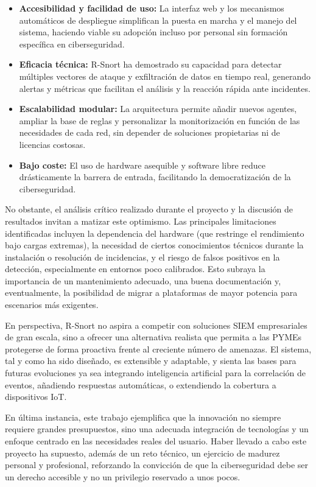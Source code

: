 \documentclass[11pt,a4paper,twoside]{report}
\begin{document}
\begin{itemize}
	\item \textbf{Accesibilidad y facilidad de uso:} La interfaz web y los mecanismos automáticos de despliegue simplifican la puesta en marcha y el manejo del sistema, haciendo viable su adopción incluso por personal sin formación específica en ciberseguridad.
	\item \textbf{Eficacia técnica:} R-Snort ha demostrado su capacidad para detectar múltiples vectores de ataque y exfiltración de datos en tiempo real, generando alertas y métricas que facilitan el análisis y la reacción rápida ante incidentes.
	\item \textbf{Escalabilidad modular:} La arquitectura permite añadir nuevos agentes, ampliar la base de reglas y personalizar la monitorización en función de las necesidades de cada red, sin depender de soluciones propietarias ni de licencias costosas.
	\item \textbf{Bajo coste:} El uso de hardware asequible y software libre reduce drásticamente la barrera de entrada, facilitando la democratización de la ciberseguridad.
\end{itemize}

No obstante, el análisis crítico realizado durante el proyecto y la discusión de resultados invitan a matizar este optimismo. Las principales limitaciones identificadas incluyen la dependencia del hardware (que restringe el rendimiento bajo cargas extremas), la necesidad de ciertos conocimientos técnicos durante la instalación o resolución de incidencias, y el riesgo de falsos positivos en la detección, especialmente en entornos poco calibrados. Esto subraya la importancia de un mantenimiento adecuado, una buena documentación y, eventualmente, la posibilidad de migrar a plataformas de mayor potencia para escenarios más exigentes.\newline

En perspectiva, R-Snort no aspira a competir con soluciones SIEM empresariales de gran escala, sino a ofrecer una alternativa realista que permita a las PYMEs protegerse de forma proactiva frente al creciente número de amenazas. El sistema, tal y como ha sido diseñado, es extensible y adaptable, y sienta las bases para futuras evoluciones ya sea integrando inteligencia artificial para la correlación de eventos, añadiendo respuestas automáticas, o extendiendo la cobertura a dispositivos IoT.\newline

En última instancia, este trabajo ejemplifica que la innovación no siempre requiere grandes presupuestos, sino una adecuada integración de tecnologías y un enfoque centrado en las necesidades reales del usuario. Haber llevado a cabo este proyecto ha supuesto, además de un reto técnico, un ejercicio de madurez personal y profesional, reforzando la convicción de que la ciberseguridad debe ser un derecho accesible y no un privilegio reservado a unos pocos.
\end{document}
